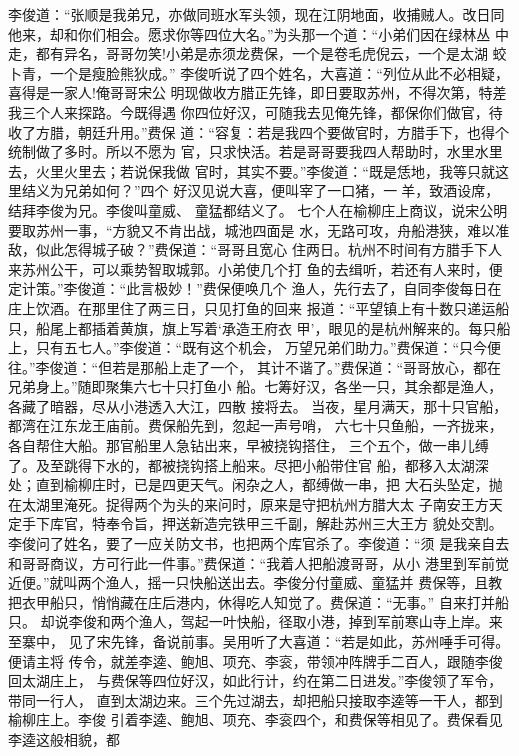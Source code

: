 李俊道：“张顺是我弟兄，亦做同班水军头领，现在江阴地面，收捕贼人。改日同
他来，却和你们相会。愿求你等四位大名。”为头那一个道：“小弟们因在绿林丛
中走，都有异名，哥哥勿笑!小弟是赤须龙费保，一个是卷毛虎倪云，一个是太湖
蛟卜青，一个是瘦脸熊狄成。”
李俊听说了四个姓名，大喜道：“列位从此不必相疑，喜得是一家人!俺哥哥宋公
明现做收方腊正先锋，即日要取苏州，不得次第，特差我三个人来探路。今既得遇
你四位好汉，可随我去见俺先锋，都保你们做官，待收了方腊，朝廷升用。”费保
道：“容复：若是我四个要做官时，方腊手下，也得个统制做了多时。所以不愿为
官，只求快活。若是哥哥要我四人帮助时，水里水里去，火里火里去；若说保我做
官时，其实不要。”李俊道：“既是恁地，我等只就这里结义为兄弟如何？”四个
好汉见说大喜，便叫宰了一口猪，一羊，致酒设席，结拜李俊为兄。李俊叫童威、
童猛都结义了。
七个人在榆柳庄上商议，说宋公明要取苏州一事，“方貌又不肯出战，城池四面是
水，无路可攻，舟船港狭，难以准敌，似此怎得城子破？”费保道：“哥哥且宽心
住两日。杭州不时间有方腊手下人来苏州公干，可以乘势智取城郭。小弟使几个打
鱼的去缉听，若还有人来时，便定计策。”李俊道：“此言极妙！”费保便唤几个
渔人，先行去了，自同李俊每日在庄上饮酒。在那里住了两三日，只见打鱼的回来
报道：“平望镇上有十数只递运船只，船尾上都插着黄旗，旗上写着‘承造王府衣
甲’，眼见的是杭州解来的。每只船上，只有五七人。”李俊道：“既有这个机会，
万望兄弟们助力。”费保道：“只今便往。”李俊道：“但若是那船上走了一个，
其计不谐了。”费保道：“哥哥放心，都在兄弟身上。”随即聚集六七十只打鱼小
船。七筹好汉，各坐一只，其余都是渔人，各藏了暗器，尽从小港透入大江，四散
接将去。
当夜，星月满天，那十只官船，都湾在江东龙王庙前。费保船先到，忽起一声号哨，
六七十只鱼船，一齐拢来，各自帮住大船。那官船里人急钻出来，早被挠钩搭住，
三个五个，做一串儿缚了。及至跳得下水的，都被挠钩搭上船来。尽把小船带住官
船，都移入太湖深处；直到榆柳庄时，已是四更天气。闲杂之人，都缚做一串，把
大石头坠定，抛在太湖里淹死。捉得两个为头的来问时，原来是守把杭州方腊大太
子南安王方天定手下库官，特奉令旨，押送新造完铁甲三千副，解赴苏州三大王方
貌处交割。李俊问了姓名，要了一应关防文书，也把两个库官杀了。李俊道：“须
是我亲自去和哥哥商议，方可行此一件事。”费保道：“我着人把船渡哥哥，从小
港里到军前觉近便。”就叫两个渔人，摇一只快船送出去。李俊分付童威、童猛并
费保等，且教把衣甲船只，悄悄藏在庄后港内，休得吃人知觉了。费保道：“无事。”
自来打并船只。
却说李俊和两个渔人，驾起一叶快船，径取小港，掉到军前寒山寺上岸。来至寨中，
见了宋先锋，备说前事。吴用听了大喜道：“若是如此，苏州唾手可得。便请主将
传令，就差李逵、鲍旭、项充、李衮，带领冲阵牌手二百人，跟随李俊回太湖庄上，
与费保等四位好汉，如此行计，约在第二日进发。”李俊领了军令，带同一行人，
直到太湖边来。三个先过湖去，却把船只接取李逵等一干人，都到榆柳庄上。李俊
引着李逵、鲍旭、项充、李衮四个，和费保等相见了。费保看见李逵这般相貌，都
